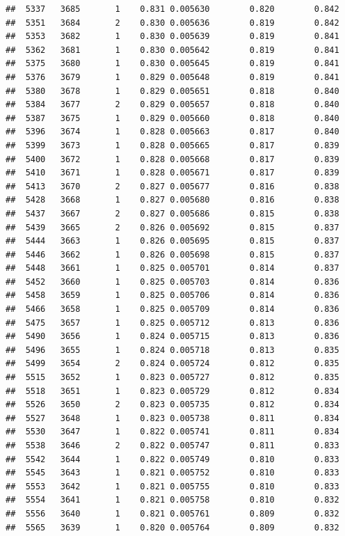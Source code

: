 \documentclass[
]{book}
\begin{document}
\begin{verbatim}
##  5337   3685       1    0.831 0.005630        0.820        0.842
##  5351   3684       2    0.830 0.005636        0.819        0.842
##  5353   3682       1    0.830 0.005639        0.819        0.841
##  5362   3681       1    0.830 0.005642        0.819        0.841
##  5375   3680       1    0.830 0.005645        0.819        0.841
##  5376   3679       1    0.829 0.005648        0.819        0.841
##  5380   3678       1    0.829 0.005651        0.818        0.840
##  5384   3677       2    0.829 0.005657        0.818        0.840
##  5387   3675       1    0.829 0.005660        0.818        0.840
##  5396   3674       1    0.828 0.005663        0.817        0.840
##  5399   3673       1    0.828 0.005665        0.817        0.839
##  5400   3672       1    0.828 0.005668        0.817        0.839
##  5410   3671       1    0.828 0.005671        0.817        0.839
##  5413   3670       2    0.827 0.005677        0.816        0.838
##  5428   3668       1    0.827 0.005680        0.816        0.838
##  5437   3667       2    0.827 0.005686        0.815        0.838
##  5439   3665       2    0.826 0.005692        0.815        0.837
##  5444   3663       1    0.826 0.005695        0.815        0.837
##  5446   3662       1    0.826 0.005698        0.815        0.837
##  5448   3661       1    0.825 0.005701        0.814        0.837
##  5452   3660       1    0.825 0.005703        0.814        0.836
##  5458   3659       1    0.825 0.005706        0.814        0.836
##  5466   3658       1    0.825 0.005709        0.814        0.836
##  5475   3657       1    0.825 0.005712        0.813        0.836
##  5490   3656       1    0.824 0.005715        0.813        0.836
##  5496   3655       1    0.824 0.005718        0.813        0.835
##  5499   3654       2    0.824 0.005724        0.812        0.835
##  5515   3652       1    0.823 0.005727        0.812        0.835
##  5518   3651       1    0.823 0.005729        0.812        0.834
##  5526   3650       2    0.823 0.005735        0.812        0.834
##  5527   3648       1    0.823 0.005738        0.811        0.834
##  5530   3647       1    0.822 0.005741        0.811        0.834
##  5538   3646       2    0.822 0.005747        0.811        0.833
##  5542   3644       1    0.822 0.005749        0.810        0.833
##  5545   3643       1    0.821 0.005752        0.810        0.833
##  5553   3642       1    0.821 0.005755        0.810        0.833
##  5554   3641       1    0.821 0.005758        0.810        0.832
##  5556   3640       1    0.821 0.005761        0.809        0.832
##  5565   3639       1    0.820 0.005764        0.809        0.832

\end{verbatim}
\end{document}
